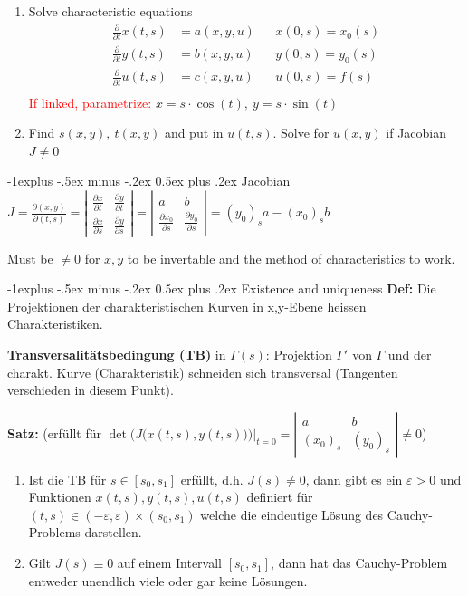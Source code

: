 \documentclass[10pt,landscape]{article}
\makeatletter
\renewcommand{\subsection}{\@startsection{subsection}{2}{0mm}%
                                {-1explus -.5ex minus -.2ex}%
                                {0.5ex plus .2ex}%
                                {\normalfont\normalsize\bfseries}}
\newcommand{\Pabl}[2] {\frac{\partial#1}{\partial#2}}
\newcommand{\MATRABS}[1]{ \displaystyle \left| \begin{matrix} #1 \end{matrix} \right|}
\makeatother
\begin{document}
\begin{multicols}{2}
\begin{enumerate}
\item Solve characteristic equations
  \begin{align*}
    \frac{\partial}{\partial t}x(t,s)&=a(x,y,u) && x(0,s)=x_0(s)\\
    \frac{\partial}{\partial t}y(t,s)&=b(x,y,u) && y(0,s)=y_0(s)\\
    \frac{\partial}{\partial t}u(t,s)&=c(x,y,u) && u(0,s)=f(s)\\
  \end{align*}
  \textcolor{red}{If linked, parametrize:} $x=s\cdot\cos(t),\ y=s\cdot\sin(t)$
\item Find $s(x,y),\ t(x,y)$ and put in $u(t,s)$. Solve for $u(x,y)$ if Jacobian $J\neq0$

\end{enumerate}   

\subsection{Jacobian}
$J
= \frac{\partial (x,y)}{\partial(t,s)}
= \MATRABS{\Pabl{x}{t} & \Pabl{y}{t} \\[4pt] \Pabl{x}{s} & \Pabl{y}{s} }
= \MATRABS{a & b \\[4pt] \Pabl{x_0}{s} & \Pabl{y_0}{s} }
= (y_0)_sa - (x_0)_sb$

Must be $\neq0$ for $x,y$ to be invertable and the method of characteristics to work.

\subsection{Existence and uniqueness}
\textbf{Def:} Die Projektionen der charakteristischen Kurven in x,y-Ebene heissen Charakteristiken.

\textbf{Transversalitätsbedingung (TB)} in $\Gamma(s)$:
Projektion $\Gamma'$ von $\Gamma$ und der charakt. Kurve (Charakteristik) schneiden sich transversal 
(Tangenten verschieden in diesem Punkt). 

\textbf{Satz:} (erfüllt für $\det\Big(J\big(x(t,s),y(t,s)\big)\Big)|_{t=0}=\MATRABS{a & b \\[4pt] (x_0)_s & (y_0)_s }\neq0$) \\

\begin{enumerate}
  \item Ist die TB für $s \in [s_0, s_1] $ erfüllt, d.h. $J(s) \neq 0$, dann gibt es ein 
  $\varepsilon > 0$ und Funktionen $x(t,s), y(t,s), u(t,s)$ definiert für $(t,s) \in (-\varepsilon,
  \varepsilon) \times (s_0, s_1)$ welche die eindeutige Lösung des Cauchy-Problems darstellen.
  \item Gilt $J(s) \equiv 0$ auf einem Intervall $[s_0,s_1]$, dann hat das Cauchy-Problem entweder
  unendlich viele oder gar keine Lösungen. 
\end{enumerate}


\end{multicols}
\end{document}
